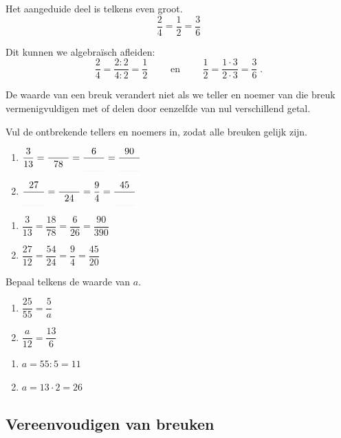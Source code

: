 \documentclass{bis}
\begin{document}
Het aangeduide deel is telkens even groot.
\[\dfrac{2}{4}=\dfrac{1}{2}=\dfrac{3}{6}\]

Dit kunnen we algebraïsch afleiden:
\[\dfrac{2}{4}=\dfrac{2:2}{4:2}=\dfrac{1}{2} \qquad\text{ en }\qquad\dfrac{1}{2}=\dfrac{1\cdot 3}{2\cdot 3}=\dfrac{3}{6}\;.\]

\begin{onthoud}
De waarde van een breuk verandert niet als we teller en noemer van die breuk vermenigvuldigen met of delen door eenzelfde van nul verschillend getal.
\end{onthoud}

\begin{exercise}
Vul de ontbrekende tellers en noemers in, zodat alle breuken gelijk zijn.
\begin{enumerate}
  \item $\dfrac{3}{13}=\dfrac{\arule{0.75cm}}{78}=\dfrac{6}{\arule{0.75cm}}=\dfrac{90}{\arule{0.75cm}}$
  \item $\dfrac{27}{\arule{0.75cm}}=\dfrac{\arule{0.75cm}}{24}=\dfrac{9}{4}=\dfrac{45}{\arule{0.75cm}}$
\end{enumerate}
\end{exercise}

\begin{solution}
\begin{enumerate}
  \item $\dfrac{3}{13}=\dfrac{18}{78}=\dfrac{6}{26}=\dfrac{90}{390}$
  \item $\dfrac{27}{12}=\dfrac{54}{24}=\dfrac{9}{4}=\dfrac{45}{20}$
\end{enumerate}
\end{solution}

\begin{exercise}
Bepaal telkens de waarde van $a$.
\begin{enumerate}
  \item $\dfrac{25}{55}=\dfrac{5}{a}$
  \item $\dfrac{a}{12}=\dfrac{13}{6}$
\end{enumerate}
\end{exercise}

\begin{solution}
\begin{enumerate}
  \item $a=55:5=11$
  \item $a=13\cdot 2=26$
\end{enumerate}
\end{solution}

\subsection{Vereenvoudigen van breuken}
\end{document}
